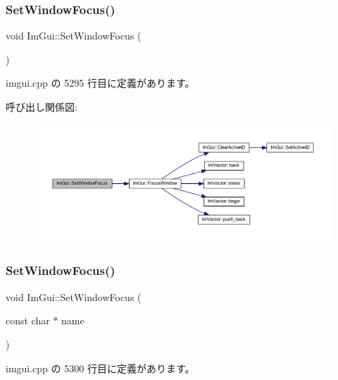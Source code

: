 \subsubsection{\texorpdfstring{Set\+Window\+Focus()}{SetWindowFocus()}\hspace{0.1cm}{\footnotesize\ttfamily [1/2]}}
{\footnotesize\ttfamily void Im\+Gui\+::\+Set\+Window\+Focus (\begin{DoxyParamCaption}{ }\end{DoxyParamCaption})}



 imgui.\+cpp の 5295 行目に定義があります。

呼び出し関係図\+:\nopagebreak
\begin{figure}[H]
\begin{center}
\leavevmode
\includegraphics[width=350pt]{namespace_im_gui_ac71920931ed7b7c8594ee84c6a94e7b8_cgraph}
\end{center}
\end{figure}
\mbox{\label{namespace_im_gui_aa612adbb975051090898f094a1608f24}} 
\subsubsection{\texorpdfstring{Set\+Window\+Focus()}{SetWindowFocus()}\hspace{0.1cm}{\footnotesize\ttfamily [2/2]}}
{\footnotesize\ttfamily void Im\+Gui\+::\+Set\+Window\+Focus (\begin{DoxyParamCaption}\item[{const char $\ast$}]{name }\end{DoxyParamCaption})}



 imgui.\+cpp の 5300 行目に定義があります。

